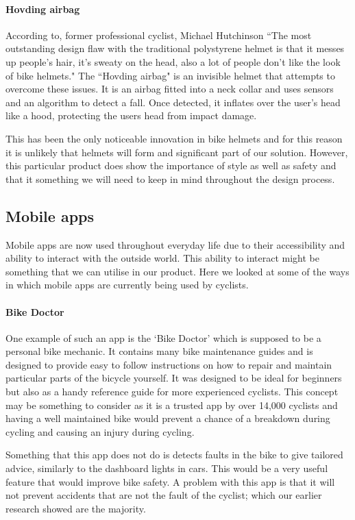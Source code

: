 \documentclass[a4paper]{report}
\begin{document}
\paragraph{Hovding airbag}According to, former professional cyclist, Michael Hutchinson ``The most outstanding design flaw with the traditional polystyrene helmet is that it messes up people's hair, it's sweaty on the head, also a lot of people don't like the look of bike helmets."\cite{hutch} The ``Hovding airbag" \cite{hovding} is an invisible helmet that attempts to overcome these issues. It is an airbag fitted into a neck collar and uses sensors and an algorithm to detect a fall. Once detected, it inflates over the user’s head like a hood, protecting the users head from impact damage.

This has been the only noticeable innovation in bike helmets and for this reason it is unlikely that helmets will form and significant part of our solution. However, this particular product does show the importance of style as well as safety and that it something we will need to keep in mind throughout the design process.

\subsection{Mobile apps}
Mobile apps are now used throughout everyday life due to their accessibility and ability to interact with the outside world. This ability to interact might be something that we can utilise in our product. Here we looked at some of the ways in which mobile apps are currently being used by cyclists.

\paragraph{Bike Doctor} One example of such an app is the `Bike Doctor'\cite{bike_doctor} which is supposed to be a personal bike mechanic. It contains many bike maintenance guides and is designed to provide easy to follow instructions on how to repair and maintain particular parts of the bicycle yourself. It was designed to be ideal for beginners but also as a handy reference guide for more experienced cyclists. This concept may be something to consider as it is a trusted app by over 14,000 cyclists and having a well maintained bike would prevent a chance of a breakdown during cycling and causing an injury during cycling. 

Something that this app does not do is detects faults in the bike to give tailored advice, similarly to the dashboard lights in cars. This would be a very useful feature that would improve bike safety. A problem with this app is that it will not prevent accidents that are not the fault of the cyclist; which our earlier research showed are the majority.
\end{document}
